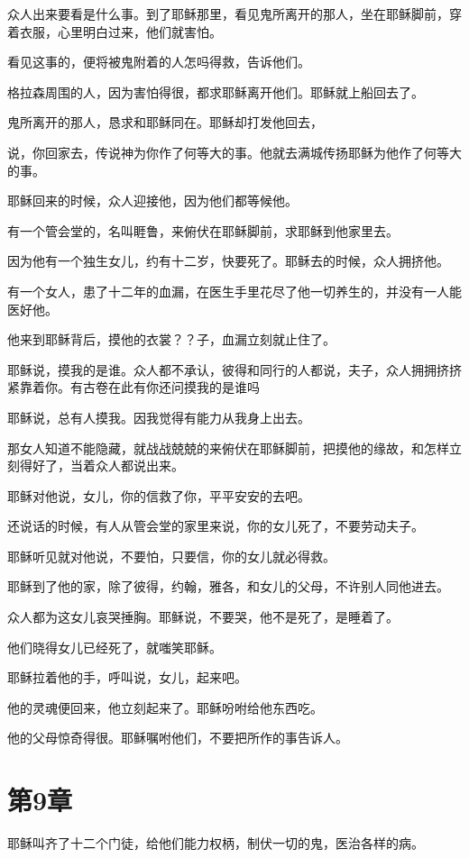 \documentclass[12pt,oneside]{book}
\begin{document}
众人出来要看是什么事。到了耶稣那里，看见鬼所离开的那人，坐在耶稣脚前，穿着衣服，心里明白过来，他们就害怕。

看见这事的，便将被鬼附着的人怎吗得救，告诉他们。

格拉森周围的人，因为害怕得很，都求耶稣离开他们。耶稣就上船回去了。

鬼所离开的那人，恳求和耶稣同在。耶稣却打发他回去，

说，你回家去，传说神为你作了何等大的事。他就去满城传扬耶稣为他作了何等大的事。

耶稣回来的时候，众人迎接他，因为他们都等候他。

有一个管会堂的，名叫睚鲁，来俯伏在耶稣脚前，求耶稣到他家里去。

因为他有一个独生女儿，约有十二岁，快要死了。耶稣去的时候，众人拥挤他。

有一个女人，患了十二年的血漏，在医生手里花尽了他一切养生的，并没有一人能医好他。

他来到耶稣背后，摸他的衣裳？？子，血漏立刻就止住了。

耶稣说，摸我的是谁。众人都不承认，彼得和同行的人都说，夫子，众人拥拥挤挤紧靠着你。有古卷在此有你还问摸我的是谁吗

耶稣说，总有人摸我。因我觉得有能力从我身上出去。

那女人知道不能隐藏，就战战兢兢的来俯伏在耶稣脚前，把摸他的缘故，和怎样立刻得好了，当着众人都说出来。

耶稣对他说，女儿，你的信救了你，平平安安的去吧。

还说话的时候，有人从管会堂的家里来说，你的女儿死了，不要劳动夫子。

耶稣听见就对他说，不要怕，只要信，你的女儿就必得救。

耶稣到了他的家，除了彼得，约翰，雅各，和女儿的父母，不许别人同他进去。

众人都为这女儿哀哭捶胸。耶稣说，不要哭，他不是死了，是睡着了。

他们晓得女儿已经死了，就嗤笑耶稣。

耶稣拉着他的手，呼叫说，女儿，起来吧。

他的灵魂便回来，他立刻起来了。耶稣吩咐给他东西吃。

他的父母惊奇得很。耶稣嘱咐他们，不要把所作的事告诉人。

\chapter{第9章}
耶稣叫齐了十二个门徒，给他们能力权柄，制伏一切的鬼，医治各样的病。
\end{document}
